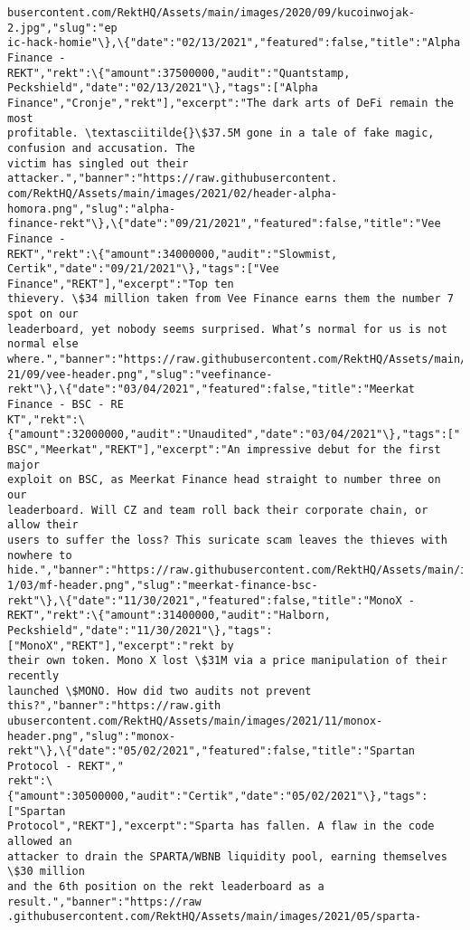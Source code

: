 \documentclass[11pt]{article}
\begin{document}
\begin{Verbatim}[commandchars=\\\{\}]
busercontent.com/RektHQ/Assets/main/images/2020/09/kucoinwojak-2.jpg","slug":"ep
ic-hack-homie"\},\{"date":"02/13/2021","featured":false,"title":"Alpha Finance -
REKT","rekt":\{"amount":37500000,"audit":"Quantstamp,
Peckshield","date":"02/13/2021"\},"tags":["Alpha
Finance","Cronje","rekt"],"excerpt":"The dark arts of DeFi remain the most
profitable. \textasciitilde{}\$37.5M gone in a tale of fake magic, confusion and accusation. The
victim has singled out their attacker.","banner":"https://raw.githubusercontent.
com/RektHQ/Assets/main/images/2021/02/header-alpha-homora.png","slug":"alpha-
finance-rekt"\},\{"date":"09/21/2021","featured":false,"title":"Vee Finance -
REKT","rekt":\{"amount":34000000,"audit":"Slowmist,
Certik","date":"09/21/2021"\},"tags":["Vee Finance","REKT"],"excerpt":"Top ten
thievery. \$34 million taken from Vee Finance earns them the number 7 spot on our
leaderboard, yet nobody seems surprised. What’s normal for us is not normal else
where.","banner":"https://raw.githubusercontent.com/RektHQ/Assets/main/images/20
21/09/vee-header.png","slug":"veefinance-
rekt"\},\{"date":"03/04/2021","featured":false,"title":"Meerkat Finance - BSC - RE
KT","rekt":\{"amount":32000000,"audit":"Unaudited","date":"03/04/2021"\},"tags":["
BSC","Meerkat","REKT"],"excerpt":"An impressive debut for the first major
exploit on BSC, as Meerkat Finance head straight to number three on our
leaderboard. Will CZ and team roll back their corporate chain, or allow their
users to suffer the loss? This suricate scam leaves the thieves with nowhere to 
hide.","banner":"https://raw.githubusercontent.com/RektHQ/Assets/main/images/202
1/03/mf-header.png","slug":"meerkat-finance-bsc-
rekt"\},\{"date":"11/30/2021","featured":false,"title":"MonoX -
REKT","rekt":\{"amount":31400000,"audit":"Halborn,
Peckshield","date":"11/30/2021"\},"tags":["MonoX","REKT"],"excerpt":"rekt by
their own token. Mono X lost \$31M via a price manipulation of their recently
launched \$MONO. How did two audits not prevent this?","banner":"https://raw.gith
ubusercontent.com/RektHQ/Assets/main/images/2021/11/monox-
header.png","slug":"monox-
rekt"\},\{"date":"05/02/2021","featured":false,"title":"Spartan Protocol - REKT","
rekt":\{"amount":30500000,"audit":"Certik","date":"05/02/2021"\},"tags":["Spartan
Protocol","REKT"],"excerpt":"Sparta has fallen. A flaw in the code allowed an
attacker to drain the SPARTA/WBNB liquidity pool, earning themselves \$30 million
and the 6th position on the rekt leaderboard as a result.","banner":"https://raw
.githubusercontent.com/RektHQ/Assets/main/images/2021/05/sparta-

\end{Verbatim}
\end{document}
